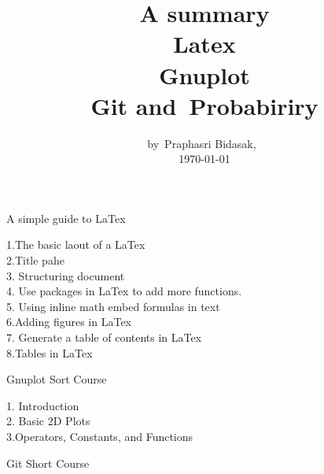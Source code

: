 \documentclass[onecolumn,journal] {IEEEtran}
\begin{document}
\title{A summary \\ Latex\\ Gnuplot \\ Git  and\ Probabiriry} %

\begin{Large}
\author{by~Praphasri  Bidasak,~\IEEEmembership \\{\today  }} 

\end{Large}

\begin{titlepage}

\end{titlepage}

 \maketitle

\newpage
\tableofcontents
\begin{Large}
 A simple guide to LaTex 
\newline
\newline
\end{Large}

1.The basic laout of a LaTex      \\                                                                                              							2.Title pahe \\
3. Structuring document \\
4. Use packages in LaTex to add more functions. \\
5. Using inline math embed formulas in text \\
6.Adding figures in LaTex \\
7. Generate a table of contents in LaTex \\
8.Tables in LaTex 
\newline
\newline
\begin{Large}
Gnuplot Sort Course\\
\end{Large}
 1. Introduction\\
2. Basic 2D Plots \\
3.Operators, Constants, and Functions
\newline
\newline
\begin{Large}
Git Short Course
\end{Large}

\newpage %
\end{document}
